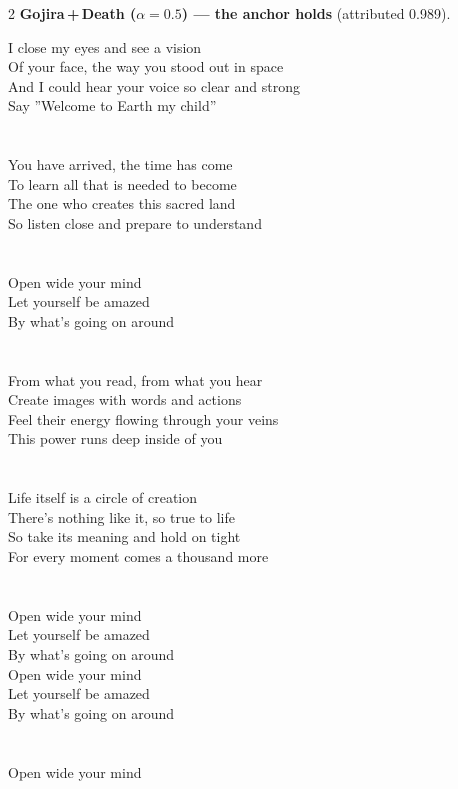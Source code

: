 \begin{multicols}{2}
\nopagebreak\noindent\textbf{Gojira\,+\,Death ($\alpha{=}0.5$) --- the anchor holds} (attributed 0.989).\par\nopagebreak\vspace{4pt}
{\footnotesize\itshape\raggedright
I close my eyes and see a vision \\
Of your face, the way you stood out in space \\
And I could hear your voice so clear and strong \\
Say ''Welcome to Earth my child'' \\
\mbox{} \\
\mbox{} \\
You have arrived, the time has come \\
To learn all that is needed to become \\
The one who creates this sacred land \\
So listen close and prepare to understand \\
\mbox{} \\
\mbox{} \\
Open wide your mind \\
Let yourself be amazed \\
By what's going on around \\
\mbox{} \\
\mbox{} \\
From what you read, from what you hear \\
Create images with words and actions \\
Feel their energy flowing through your veins \\
This power runs deep inside of you \\
\mbox{} \\
\mbox{} \\
Life itself is a circle of creation \\
There's nothing like it, so true to life \\
So take its meaning and hold on tight \\
For every moment comes a thousand more \\
\mbox{} \\
\mbox{} \\
Open wide your mind \\
Let yourself be amazed \\
By what's going on around \\
Open wide your mind \\
Let yourself be amazed \\
By what's going on around \\
\mbox{} \\
\mbox{} \\
Open wide your mind\par}
\medskip


\end{multicols}
